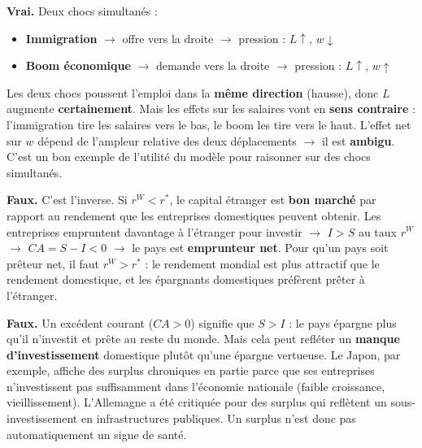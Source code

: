 
\begin{reponse}
\textbf{Vrai.} Deux chocs simultanés :
\begin{itemize}
   \item \textbf{Immigration} $\to$ offre vers la droite $\to$ pression : $L \uparrow$, $w \downarrow$
   \item \textbf{Boom économique} $\to$ demande vers la droite $\to$ pression : $L \uparrow$, $w \uparrow$
\end{itemize}
Les deux chocs poussent l'emploi dans la \textbf{même direction} (hausse), donc $L$ augmente \textbf{certainement}. Mais les effets sur les salaires vont en \textbf{sens contraire} : l'immigration tire les salaires vers le bas, le boom les tire vers le haut. L'effet net sur $w$ dépend de l'ampleur relative des deux déplacements $\to$ il est \textbf{ambigu}. C'est un bon exemple de l'utilité du modèle pour raisonner sur des chocs simultanés.
\end{reponse}



\begin{reponse}
\textbf{Faux.} C'est l'inverse. Si $r^W < r^*$, le capital étranger est \textbf{bon marché} par rapport au rendement que les entreprises domestiques peuvent obtenir. Les entreprises empruntent davantage à l'étranger pour investir $\to$ $I > S$ au taux $r^W$ $\to$ $CA = S - I < 0$ $\to$ le pays est \textbf{emprunteur net}. Pour qu'un pays soit prêteur net, il faut $r^W > r^*$ : le rendement mondial est plus attractif que le rendement domestique, et les épargnants domestiques préfèrent prêter à l'étranger.
\end{reponse}


\begin{reponse}
\textbf{Faux.} Un excédent courant ($CA > 0$) signifie que $S > I$ : le pays épargne plus qu'il n'investit et prête au reste du monde. Mais cela peut refléter un \textbf{manque d'investissement} domestique plutôt qu'une épargne vertueuse. Le Japon, par exemple, affiche des surplus chroniques en partie parce que ses entreprises n'investissent pas suffisamment dans l'économie nationale (faible croissance, vieillissement). L'Allemagne a été critiquée pour des surplus qui reflètent un sous-investissement en infrastructures publiques. Un surplus n'est donc pas automatiquement un signe de santé.
\end{reponse}

